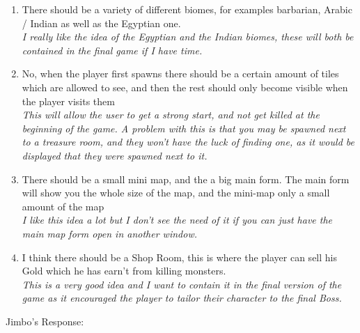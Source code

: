\documentclass[12pt]{article}
\begin{document}
\begin{enumerate}
	\item{There should be a variety of different biomes, for examples barbarian, Arabic / Indian as well as the Egyptian one.\\}
	\em{I really like the idea of the Egyptian and the Indian biomes, these will both be contained in the final game if I have time.}

	\item{No, when the player first spawns there should be a certain amount of tiles which are allowed to see, and then the rest should only become visible when the player visits them \\}
	\em{This will allow the user to get a strong start, and not get killed at the beginning of the game. A problem with this is that you may be spawned next to a treasure room, and they won't have the luck of finding one, as it would be displayed that they were spawned next to it.}

	\item{There should be a small mini map, and the a big main form. The main form will show you the whole size of the map, and the mini-map only a small amount of the map \\}
	\em{I like this idea a lot but I don't see the need of it if you can just have the main map form open in another window.}

	\item{I think there should be a Shop Room, this is where the player can sell his Gold which he has earn't from killing monsters. \\}
	\em{This is a very good idea and I want to contain it in the final version of the game as it encouraged the player to tailor their character to the final Boss.}
\end{enumerate}





\centerline{Jimbo's Response:}
\end{document}
